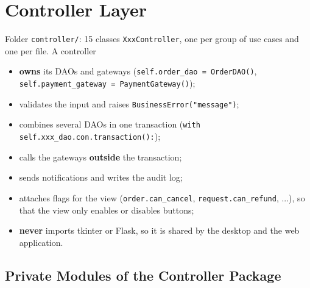 \hypertarget{controller-layer}{%
\section{Controller Layer}\label{controller-layer}}

Folder \texttt{controller/\allowbreak{}}: 15 classes \texttt{XxxController}, one per
group of use cases and one per file. A controller

\begin{itemize}
\tightlist
\item
  \textbf{owns} its DAOs and gateways
  (\texttt{self.\allowbreak{}order\_\allowbreak{}dao =\allowbreak{} OrderDAO(\allowbreak{})},
  \texttt{self.\allowbreak{}payment\_\allowbreak{}gateway =\allowbreak{} PaymentGateway(\allowbreak{})});
\item
  validates the input and raises \texttt{BusinessError(\allowbreak{}"message")};
\item
  combines several DAOs in one transaction
  (\texttt{with self.\allowbreak{}xxx\_\allowbreak{}dao.\allowbreak{}con.\allowbreak{}transaction(\allowbreak{}):});
\item
  calls the gateways \textbf{outside} the transaction;
\item
  sends notifications and writes the audit log;
\item
  attaches flags for the view (\texttt{order.\allowbreak{}can\_\allowbreak{}cancel},
  \texttt{request.\allowbreak{}can\_\allowbreak{}refund}, ...), so that the view only enables or
  disables buttons;
\item
  \textbf{never} imports tkinter or Flask, so it is shared by the
  desktop and the web application.
\end{itemize}

\hypertarget{private-modules-of-the-controller-package}{%
\subsection{Private Modules of the Controller
Package}\label{private-modules-of-the-controller-package}}

